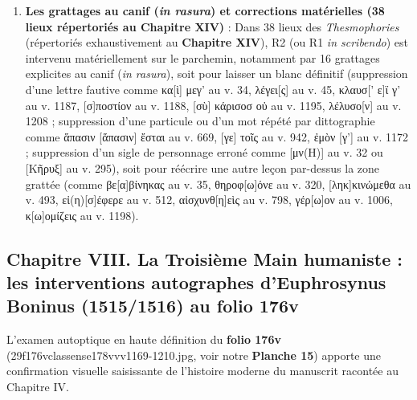\documentclass[11pt, a4paper, twoside]{article}
\renewcommand{\_}{\origunderscore\penalty0\relax}
\renewcommand{\texttt}[1]{#1}
\newcommand{\Run}{\textbf{R}\textsuperscript{1}}
\newcommand{\Rdeux}{\textbf{R}\textsuperscript{2}}
\newcommand{\inRas}[2]{[\kern-0.15em[#1]\kern-0.15em]#2}
\newcommand{\auDessus}[2]{\ensuremath{\overset{\text{#2}}{\text{#1}}}}
\def\Run{R1}%
\def\Rdeux{R2}%
\def\inRas#1#2{[#1]#2}%
\def\auDessus#1#2{#1(#2)}%
\begin{document}
\begin{enumerate}[leftmargin=1.6em, itemsep=2pt]
  \item \textbf{Les grattages au canif (\textit{in rasura}) et corrections matérielles (38 lieux répertoriés au Chapitre XIV)} : Dans 38 lieux des \textit{Thesmophories} (répertoriés exhaustivement au \textbf{Chapitre XIV}), \Rdeux{} (ou \Run{} \textit{in scribendo}) est intervenu matériellement sur le parchemin, notamment par 16 grattages explicites au canif (\textit{in rasura}), soit pour laisser un blanc définitif (suppression d'une lettre fautive comme \texttt{κα\inRas{ὶ}{} μεγ'} au v. 34, \texttt{λέγει\inRas{ς}{}} au v. 45, \texttt{κλαυσ\inRas{' ε}{}ϊ γ'} au v. 1187, \texttt{\inRas{σ}{}ποστίον} au v. 1188, \texttt{\inRas{σὺ}{} κάρισοσ οὐ} au v. 1195, \texttt{λέλυσο\inRas{ν}{}} au v. 1208 ; suppression d'une particule ou d'un mot répété par dittographie comme \texttt{ἅπασιν \inRas{ἅπασιν}{} ἔσται} au v. 669, \texttt{\inRas{γε}{} τοῖς} au v. 942, \texttt{ἐμὸν \inRas{γ'}{}} au v. 1172 ; suppression d'un sigle de personnage erroné comme \texttt{\inRas{μ\auDessus{ν}{Η}}{}} au v. 32 ou \texttt{\inRas{Κῆρυξ}{}} au v. 295), soit pour réécrire une autre leçon par-dessus la zone grattée (comme \texttt{βε\inRas{α}{β}ίνηκας} au v. 35, \texttt{θηροφ\inRas{ω}{ό}νε} au v. 320, \texttt{\inRas{ληκ}{κιν}ώμεθα} au v. 493, \texttt{\auDessus{εἰ}{η}\inRas{σ}{}έφερε} au v. 512, \texttt{αἰσχυνθ\inRas{η}{εὶ}ς} au v. 798, \texttt{γέρ\inRas{ω}{ο}ν} au v. 1006, \texttt{κ\inRas{ω}{ο}μίζεις} au v. 1198).
\end{enumerate}



\subsection{Chapitre VIII. La Troisième Main humaniste : les interventions autographes d'Euphrosynus Boninus (1515/1516) au folio \texttt{176v}}

L'examen autoptique en haute définition du \textbf{folio \texttt{176v}} (\texttt{29\_f176v\_classense178v\_vv1169-1210.jpg}, voir notre \textbf{Planche 15}) apporte une confirmation visuelle saisissante de l'histoire moderne du manuscrit racontée au Chapitre IV.
\end{document}
